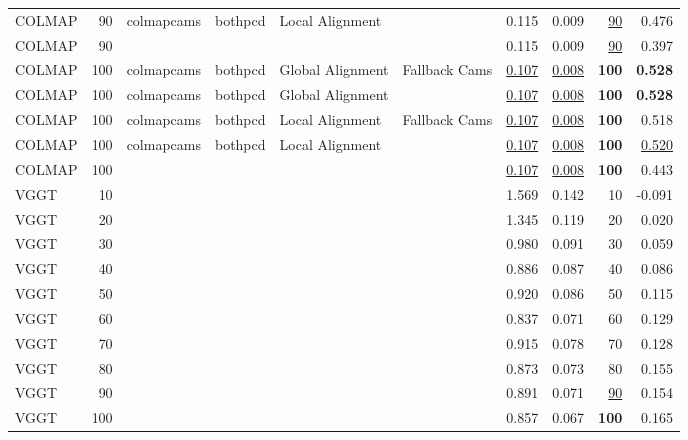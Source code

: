 \begin{table}[H]
\begin{tabular}{lrllllrrrr}
COLMAP & 90 & colmapcams & bothpcd & Local Alignment &  & 0.115 & 0.009 & \underline{90} & 0.476 \\
COLMAP & 90 &  &  &  &  & 0.115 & 0.009 & \underline{90} & 0.397 \\
COLMAP & 100 & colmapcams & bothpcd & Global Alignment & Fallback Cams & \underline{0.107} & \underline{0.008} & \textbf{100} & \textbf{0.528} \\
COLMAP & 100 & colmapcams & bothpcd & Global Alignment &  & \underline{0.107} & \underline{0.008} & \textbf{100} & \textbf{0.528} \\
COLMAP & 100 & colmapcams & bothpcd & Local Alignment & Fallback Cams & \underline{0.107} & \underline{0.008} & \textbf{100} & 0.518 \\
COLMAP & 100 & colmapcams & bothpcd & Local Alignment &  & \underline{0.107} & \underline{0.008} & \textbf{100} & \underline{0.520} \\
COLMAP & 100 &  &  &  &  & \underline{0.107} & \underline{0.008} & \textbf{100} & 0.443 \\
VGGT & 10 &  &  &  &  & 1.569 & 0.142 & 10 & -0.091 \\
VGGT & 20 &  &  &  &  & 1.345 & 0.119 & 20 & 0.020 \\
VGGT & 30 &  &  &  &  & 0.980 & 0.091 & 30 & 0.059 \\
VGGT & 40 &  &  &  &  & 0.886 & 0.087 & 40 & 0.086 \\
VGGT & 50 &  &  &  &  & 0.920 & 0.086 & 50 & 0.115 \\
VGGT & 60 &  &  &  &  & 0.837 & 0.071 & 60 & 0.129 \\
VGGT & 70 &  &  &  &  & 0.915 & 0.078 & 70 & 0.128 \\
VGGT & 80 &  &  &  &  & 0.873 & 0.073 & 80 & 0.155 \\
VGGT & 90 &  &  &  &  & 0.891 & 0.071 & \underline{90} & 0.154 \\
VGGT & 100 &  &  &  &  & 0.857 & 0.067 & \textbf{100} & 0.165 \\
\bottomrule
\end{tabular}
\end{table}
